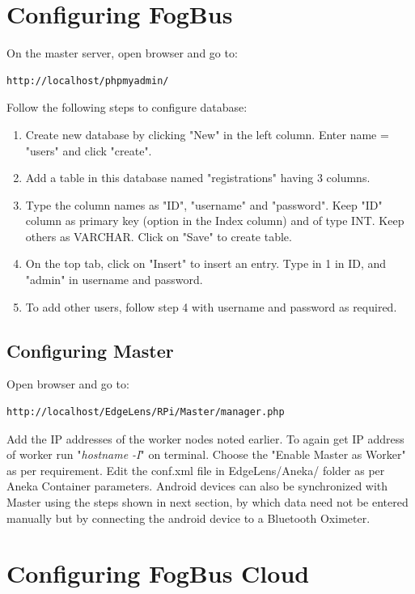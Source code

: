 \documentclass{article}
\begin{document}
\section{Configuring FogBus}

On the master server, open browser and go to:
\begin{lstlisting}[style=BashInputStyle]
    http://localhost/phpmyadmin/
\end{lstlisting}
Follow the following steps to configure database:
\begin{enumerate}
\item Create new database by clicking "New" in the left column. Enter name = "users" and click "create".
\item Add a table in this database named "registrations" having 3 columns.
\item Type the column names as "ID", "username" and "password". Keep "ID" column as primary key (option in the Index column) and of type INT. Keep others as VARCHAR. Click on "Save" to create table.
\item On the top tab, click on "Insert" to insert an entry. Type in 1 in ID, and "admin" in username and password.
\item To add other users, follow step 4 with username and password as required.
\end{enumerate}


\subsection{Configuring Master}
Open browser and go to:
\begin{lstlisting}[style=BashInputStyle]
    http://localhost/EdgeLens/RPi/Master/manager.php
\end{lstlisting}
Add the IP addresses of the worker nodes noted earlier. To again get IP address of worker run "\textit{hostname -I}" on terminal. Choose the "Enable Master as Worker" as per requirement. Edit the conf.xml file in EdgeLens/Aneka/ folder as per Aneka Container parameters. Android devices can also be synchronized with Master using the steps shown in next section, by which data need not be entered manually but by connecting the android device to a Bluetooth Oximeter.

\newpage

\section{Configuring FogBus Cloud}
\end{document}
